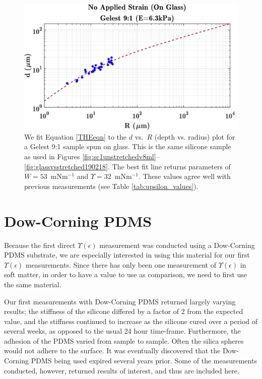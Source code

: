 \begin{figure}[h!]
	\centering
	\includegraphics[width=\linewidth]{Chapters/Figures/w_ups_fit_G9-1}
	\caption[Gelest W-$\Upsilon$ Fit]{We fit Equation \ref{THEeqn} to the $ d $ vs.~$ R $ (depth vs. radius) plot for a Gelest 9:1 sample spun on glass. This is the same silicone sample as used in Figures \ref{fig:sc1unstretchedv8ml}--\ref{fig:glassvsstretched190218}. The best fit line returns parameters of $ W=53 $~mNm$^{-1}$  and $ \Upsilon=32 $~mNm$^{-1}$. These values agree well with previous measurements (see Table \ref{tab:upsilon_values}).}
	\label{fig:wupsfitg9-1}
\end{figure}

\section{Dow-Corning PDMS}
Because the first direct $ \Upsilon(\epsilon) $ measurement \cite{xu2017direct} was conducted using a Dow-Corning PDMS substrate, we are especially interested in using this material for our first $ \Upsilon(\epsilon) $ measurements. Since there has only been one measurement of $ \Upsilon(\epsilon) $ in soft matter, in order to have a value to use as comparison, we need to first use the same material. 

Our first measurements with Dow-Corning PDMS returned largely varying results; the stiffness of the silicone differed by a factor of 2 from the expected value, and the stiffness continued to increase as the silicone cured over a period of several weeks, as opposed to the usual 24 hour time-frame. Furthermore, the adhesion of the PDMS varied from sample to sample. Often the silica spheres would not adhere to the surface. It was eventually discovered that the Dow-Corning PDMS being used expired several years prior. Some of the measurements conducted, however, returned results of interest, and thus are included here.


